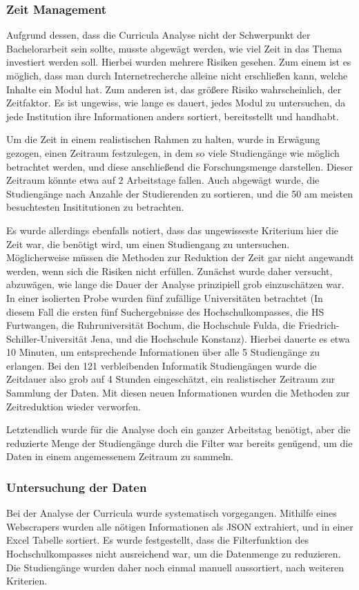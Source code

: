 \subsubsection{Zeit Management}\label{sec:time_management}
Aufgrund dessen, dass die Curricula Analyse nicht der Schwerpunkt der Bachelorarbeit sein sollte, musste abgewägt werden, wie viel Zeit in das Thema investiert werden soll.
Hierbei wurden mehrere Risiken gesehen. Zum einem ist es möglich, dass man durch Internetrecherche alleine nicht erschließen kann, welche Inhalte ein Modul hat.
Zum anderen ist, das größere Risiko wahrscheinlich, der Zeitfaktor. Es ist ungewiss, wie lange es dauert, jedes Modul zu untersuchen, da jede Institution ihre Informationen anders sortiert, bereitsstellt und handhabt.

Um die Zeit in einem realistischen Rahmen zu halten, wurde in Erwägung gezogen, einen Zeitraum festzulegen, in dem so viele Studiengänge wie möglich betrachtet werden, und diese anschließend die Forschungsmenge darstellen. Dieser Zeitraum könnte etwa auf 2 Arbeitstage fallen. Auch abgewägt wurde, die Studiengänge nach Anzahle der Studierenden zu sortieren, und die 50 am meisten besuchtesten Insititutionen zu betrachten.

Es wurde allerdings ebenfalls notiert, dass das ungewisseste Kriterium hier die Zeit war, die benötigt wird, um einen Studiengang zu untersuchen. Möglicherweise müssen die Methoden zur Reduktion der Zeit gar nicht angewandt werden, wenn sich die Risiken nicht erfüllen. Zunächst wurde daher versucht, abzuwägen, wie lange die Dauer der Analyse prinzipiell grob einzuschätzen war.
In einer isolierten Probe wurden fünf zufällige Universitäten betrachtet (In diesem Fall die ersten fünf Suchergebnisse des Hochschulkompasses, die HS Furtwangen, die Ruhruniversität Bochum, die Hochschule Fulda, die Friedrich-Schiller-Universität Jena, und die Hochschule Konstanz).
Hierbei dauerte es etwa 10 Minuten, um entsprechende Informationen über alle 5 Studiengänge zu erlangen.
Bei den 121 verbleibenden Informatik Studiengängen wurde die Zeitdauer also grob auf 4 Stunden eingeschätzt, ein realistischer Zeitraum zur Sammlung der Daten. Mit diesen neuen Informationen wurden die Methoden zur Zeitreduktion wieder verworfen.

Letztendlich wurde für die Analyse doch ein ganzer Arbeitstag benötigt, aber die reduzierte Menge der Studiengänge durch die Filter war bereits genügend, um die Daten in einem angemessenem Zeitraum zu sammeln.

\subsubsection{Untersuchung der Daten}\label{sec:sorting}
Bei der Analyse der Curricula wurde systematisch vorgegangen. Mithilfe eines Webscrapers wurden alle nötigen Informationen als JSON extrahiert, und in einer Excel Tabelle sortiert.
Es wurde festgestellt, dass die Filterfunktion des Hochschulkompasses nicht ausreichend war, um die Datenmenge zu reduzieren. Die Studiengänge wurden daher noch einmal manuell aussortiert, nach weiteren Kriterien.

